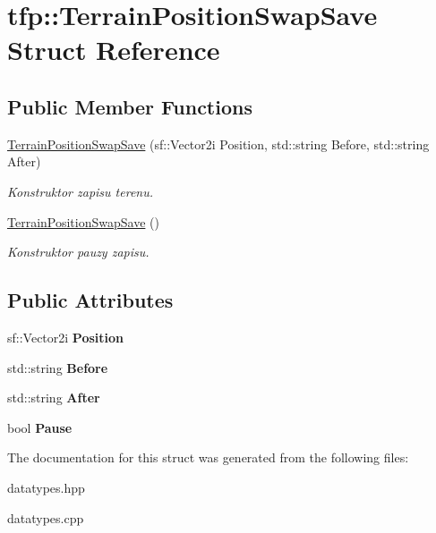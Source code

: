 \hypertarget{structtfp_1_1_terrain_position_swap_save}{}\section{tfp\+:\+:Terrain\+Position\+Swap\+Save Struct Reference}
\label{structtfp_1_1_terrain_position_swap_save}
\subsection*{Public Member Functions}
\begin{DoxyCompactItemize}
\item 
\mbox{\label{structtfp_1_1_terrain_position_swap_save_a7146e314d744f18b3ede1587bacbeacb}} 
\mbox{\hyperlink{structtfp_1_1_terrain_position_swap_save_a7146e314d744f18b3ede1587bacbeacb}{Terrain\+Position\+Swap\+Save}} (sf\+::\+Vector2i Position, std\+::string Before, std\+::string After)
\begin{DoxyCompactList}\small\item\em Konstruktor zapisu terenu. \end{DoxyCompactList}\item 
\mbox{\label{structtfp_1_1_terrain_position_swap_save_a438935c6645689603bbdf8e561180932}} 
\mbox{\hyperlink{structtfp_1_1_terrain_position_swap_save_a438935c6645689603bbdf8e561180932}{Terrain\+Position\+Swap\+Save}} ()
\begin{DoxyCompactList}\small\item\em Konstruktor pauzy zapisu. \end{DoxyCompactList}\end{DoxyCompactItemize}
\subsection*{Public Attributes}
\begin{DoxyCompactItemize}
\item 
\mbox{\label{structtfp_1_1_terrain_position_swap_save_ac54bf76d463666be0cf8cc190c222ff4}} 
sf\+::\+Vector2i {\bfseries Position}
\item 
\mbox{\label{structtfp_1_1_terrain_position_swap_save_aa019713beaa39be6d09bb89eb24aaf02}} 
std\+::string {\bfseries Before}
\item 
\mbox{\label{structtfp_1_1_terrain_position_swap_save_aee283da9413282012bc29850cfb16b6d}} 
std\+::string {\bfseries After}
\item 
\mbox{\label{structtfp_1_1_terrain_position_swap_save_adff7651fdba2ae3af673b8274f7ed4f6}} 
bool {\bfseries Pause}
\end{DoxyCompactItemize}


The documentation for this struct was generated from the following files\+:\begin{DoxyCompactItemize}
\item 
datatypes.\+hpp\item 
datatypes.\+cpp\end{DoxyCompactItemize}

